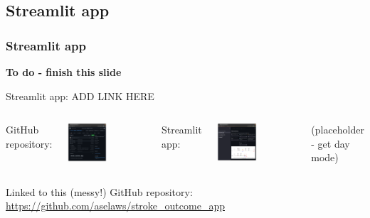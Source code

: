 \documentclass[xcolor={usenames,dvipsnames}]{beamer}
\newcommand{\smallurl}[1]{\textcolor{blue}{\fontsize{4pt}{4.8pt}\selectfont \url{#1}}}
\begin{document}

\subsection{Streamlit app} %
\begin{frame}
\frametitle{Streamlit app}

\textbf{To do - finish this slide} 

Streamlit app: ADD LINK HERE 


\begin{columns}
    GitHub repository: 
    \begin{center} 
    \includegraphics[width=0.5\textwidth]{./images/GitHub-streamlit}
    \end{center} 
  
    Streamlit app:
    \begin{center} 
    \includegraphics[width=0.5\textwidth]{./images/Streamlit-screenshot}
    \end{center} 
    (placeholder - get day mode) 
\end{columns}

Linked to this (messy!) GitHub repository: \smallurl{https://github.com/aselaws/stroke_outcome_app}

\end{frame}
\end{document}
